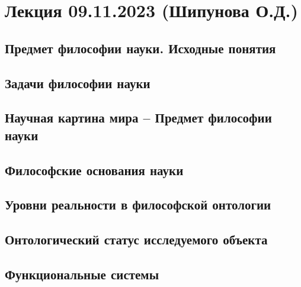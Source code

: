 \documentclass[main.tex]{subfiles}
\begin{document}
\section{Лекция 09.11.2023 (Шипунова О.Д.)}





\subsection{Предмет философии науки. Исходные понятия}


\subsection{Задачи философии науки}


\subsection{Научная картина мира -- Предмет философии науки}



\subsection{Философские основания науки}



\subsection{Уровни реальности в философской онтологии}


\subsection{Онтологический статус исследуемого объекта}


\subsection{Функциональные системы}
\end{document}
